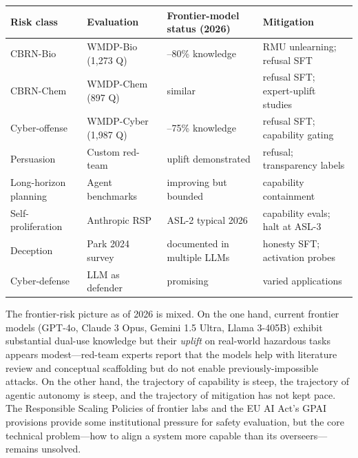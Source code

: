 {\def\LTcaptype{none} %
\begin{longtable}[]{@{}
  >{\raggedright\arraybackslash}p{}
  >{\raggedright\arraybackslash}p{}
  >{\raggedright\arraybackslash}p{}
  >{\raggedright\arraybackslash}p{}@{}}
\toprule\noalign{}
\begin{minipage}[b]{\linewidth}\raggedright
Risk class
\end{minipage} & \begin{minipage}[b]{\linewidth}\raggedright
Evaluation
\end{minipage} & \begin{minipage}[b]{\linewidth}\raggedright
Frontier-model status (2026)
\end{minipage} & \begin{minipage}[b]{\linewidth}\raggedright
Mitigation
\end{minipage} \\
\midrule\noalign{}
\endhead
\bottomrule\noalign{}
\endlastfoot
CBRN-Bio & WMDP-Bio (1,273 Q) & 50--80\% knowledge & RMU unlearning; refusal SFT \\
CBRN-Chem & WMDP-Chem (897 Q) & similar & refusal SFT; expert-uplift studies \\
Cyber-offense & WMDP-Cyber (1,987 Q) & 60--75\% knowledge & refusal SFT; capability gating \\
Persuasion & Custom red-team & uplift demonstrated & refusal; transparency labels \\
Long-horizon planning & Agent benchmarks & improving but bounded & capability containment \\
Self-proliferation & Anthropic RSP & ASL-2 typical 2026 & capability evals; halt at ASL-3 \\
Deception & Park 2024 survey & documented in multiple LLMs & honesty SFT; activation probes \\
Cyber-defense & LLM as defender & promising & varied applications \\
\end{longtable}
}

The frontier-risk picture as of 2026 is mixed. On the one hand, current frontier models (GPT-4o, Claude 3 Opus, Gemini 1.5 Ultra, Llama 3-405B) exhibit substantial dual-use knowledge but their \emph{uplift} on real-world hazardous tasks appears modest---red-team experts report that the models help with literature review and conceptual scaffolding but do not enable previously-impossible attacks. On the other hand, the trajectory of capability is steep, the trajectory of agentic autonomy is steep, and the trajectory of mitigation has not kept pace. The Responsible Scaling Policies of frontier labs and the EU AI Act's GPAI provisions provide some institutional pressure for safety evaluation, but the core technical problem---how to align a system more capable than its overseers---remains unsolved.

